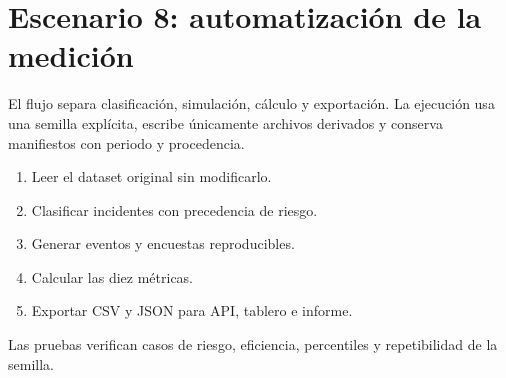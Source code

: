 \chapter{Escenario 8: automatización de la medición}

El flujo separa clasificación, simulación, cálculo y exportación. La ejecución usa una semilla explícita, escribe únicamente archivos derivados y conserva manifiestos con periodo y procedencia.

\begin{enumerate}
\item Leer el dataset original sin modificarlo.
\item Clasificar incidentes con precedencia de riesgo.
\item Generar eventos y encuestas reproducibles.
\item Calcular las diez métricas.
\item Exportar CSV y JSON para API, tablero e informe.
\end{enumerate}

Las pruebas verifican casos de riesgo, eficiencia, percentiles y repetibilidad de la semilla.


